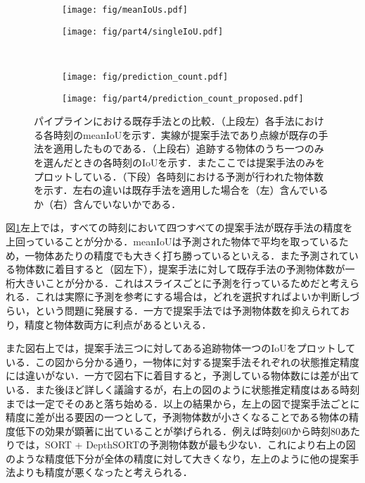 \begin{figure}[t]
    \begin{subfigure}[t]{0.5\linewidth}
        \centering
        \texttt{[image: fig/meanIoUs.pdf]}
    \end{subfigure}
    \hfill
    \begin{subfigure}[t]{.5\linewidth}
        \centering
        \texttt{[image: fig/part4/singleIoU.pdf]}
    \end{subfigure}
    \\    
    \begin{subfigure}[t]{0.5\linewidth}
        \centering
        \texttt{[image: fig/prediction\_count.pdf]} 
    \end{subfigure}
    \hfill
    \begin{subfigure}[t]{.5\linewidth}
        \centering
        \texttt{[image: fig/part4/prediction\_count\_proposed.pdf]}
    \end{subfigure}
    \vspace{-3zh}
    \caption[パイプラインにおける既存手法との比較]{パイプラインにおける既存手法との比較．（上段左）各手法における各時刻のmeanIoUを示す．実線が提案手法であり点線が既存の手法を適用したものである．（上段右）追跡する物体のうち一つのみを選んだときの各時刻のIoUを示す．またここでは提案手法のみをプロットしている．（下段）各時刻における予測が行われた物体数を示す．左右の違いは既存手法を適用した場合を（左）含んでいるか（右）含んでいないかである．}
    \label{fig:pipeline_assessment}
\end{figure}

図\ref{fig:pipeline_assessment}左上では，すべての時刻において四つすべての提案手法が既存手法の精度を上回っていることが分かる．meanIoUは予測された物体で平均を取っているため，一物体あたりの精度でも大きく打ち勝っているといえる．また予測されている物体数に着目すると（図左下），提案手法に対して既存手法の予測物体数が一桁大きいことが分かる．これはスライスごとに予測を行っているためだと考えられる．これは実際に予測を参考にする場合は，どれを選択すればよいか判断しづらい，という問題に発展する．一方で提案手法では予測物体数を抑えられており，精度と物体数両方に利点があるといえる．

また図右上では，提案手法三つに対してある追跡物体一つのIoUをプロットしている．この図から分かる通り，一物体に対する提案手法それぞれの状態推定精度には違いがない．一方で図右下に着目すると，予測している物体数には差が出ている．また後ほど詳しく議論するが，右上の図のように状態推定精度はある時刻までは一定でそのあと落ち始める．以上の結果から，左上の図で提案手法ごとに精度に差が出る要因の一つとして，予測物体数が小さくなることである物体の精度低下の効果が顕著に出ていることが挙げられる．例えば時刻$60$から時刻$80$あたりでは，SORT + DepthSORTの予測物体数が最も少ない．これにより右上の図のような精度低下分が全体の精度に対して大きくなり，左上のように他の提案手法よりも精度が悪くなったと考えられる．

